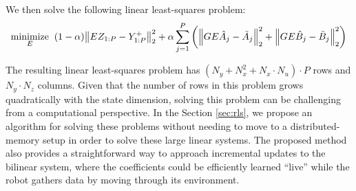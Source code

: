 \documentclass[../root.tex]{subfiles}
\begin{document}
We then solve the following linear least-squares problem:
\begin{align} \label{opt:jdmd}
  \underset{E}{\text{minimize}} \;\; 
    (1-\alpha) \norm{E Z_{1:P} - Y_{1:P}^+}_2^2 + 
        \alpha \sum_{j=1}^P \left( 
          \norm{G E \hat{A}_j - \tilde{A}_j}_2^2 + 
          \norm{G E \hat{B}_j - \tilde{B}_j}_2^2 \right)
\end{align}

The resulting linear least-squares problem has $(N_y + N_x^2 + N_x \cdot N_u) \cdot P$ rows
and $N_y \cdot N_z$ columns. Given that the number of rows in this problem grows
quadratically with the state dimension, solving this problem can be challenging from a
computational perspective. In the Section \ref{sec:rls}, we propose an algorithm for solving
these problems without needing to move to a distributed-memory setup in order to solve these
large linear systems. The proposed method also provides a straightforward way to approach
incremental updates to the bilinear system, where the coefficients could be efficiently
learned ``live'' while the robot gathers data by moving through its environment.



\end{document}
